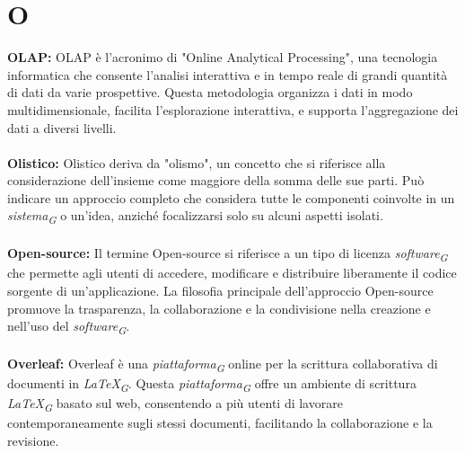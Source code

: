 \documentclass{article}
\begin{document}
\section*{O}
{}
\textbf{OLAP:} OLAP è l'acronimo di "Online Analytical Processing", una tecnologia informatica che consente l'analisi interattiva e in tempo reale di grandi quantità di dati da varie prospettive. Questa metodologia organizza i dati in modo multidimensionale, facilita l'esplorazione interattiva, e supporta l'aggregazione dei dati a diversi livelli.
\\
\\
\textbf{Olistico:} Olistico deriva da "olismo", un concetto che si riferisce alla considerazione dell'insieme come maggiore della somma delle sue parti. Può indicare un approccio completo che considera tutte le componenti coinvolte in un \textit{sistema}\textsubscript{\textit{G}} o un'idea, anziché focalizzarsi solo su alcuni aspetti isolati. 
\\
\\
\textbf{Open-source:} Il termine Open-source si riferisce a un tipo di licenza \textit{software}\textsubscript{\textit{G}} che permette agli utenti di accedere, modificare e distribuire liberamente il codice sorgente di un'applicazione. La filosofia principale dell'approccio Open-source promuove la trasparenza, la collaborazione e la condivisione nella creazione e nell'uso del \textit{software}\textsubscript{\textit{G}}.
\\
\\
\textbf{Overleaf:} Overleaf è una \textit{piattaforma}\textsubscript{\textit{G}} online per la scrittura collaborativa di documenti in \textit{LaTeX}\textsubscript{\textit{G}}. Questa \textit{piattaforma}\textsubscript{\textit{G}} offre un ambiente di scrittura \textit{LaTeX}\textsubscript{\textit{G}} basato sul web, consentendo a più utenti di lavorare contemporaneamente sugli stessi documenti, facilitando la collaborazione e la revisione.
\pagebreak
\end{document}
